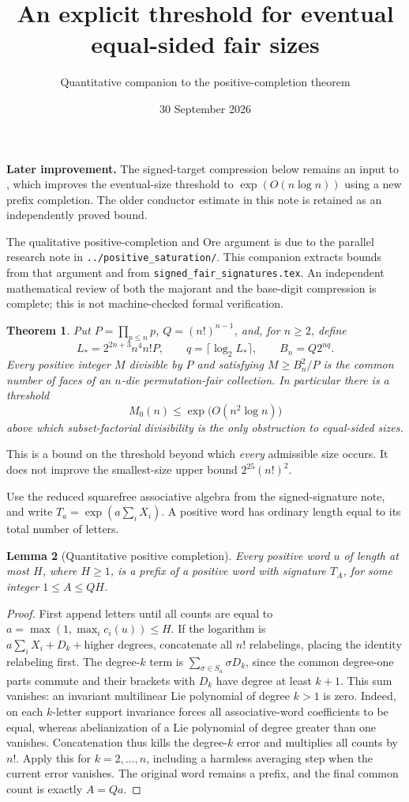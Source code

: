 \documentclass[11pt]{article}
\title{An explicit threshold for eventual equal-sided fair sizes}
\author{Quantitative companion to the positive-completion theorem}
\date{30 September 2026}
\newtheorem{theorem}{Theorem}
\newtheorem{lemma}[theorem]{Lemma}
\begin{document}
\noindent\textbf{Later improvement.} The signed-target compression below
remains an input to , which
improves the eventual-size threshold to $\exp(O(n\log n))$ using a new
prefix completion. The older conductor estimate in this note is retained
as an independently proved bound.

\maketitle

The qualitative positive-completion and Ore argument is due to the
parallel research note in \texttt{../positive\_saturation/}. This companion
extracts bounds from that argument and from
\texttt{signed\_fair\_signatures.tex}. An independent mathematical
review of both the majorant and the base-digit compression is complete;
this is not machine-checked formal verification.

\begin{theorem}\label{main}
Put $P=\prod_{p\le n}p$, $Q=(n!)^{n-1}$, and, for $n\ge2$, define
\[
 L_*=2^{2n+3}n^4n!P,\qquad q=\lceil\log_2L_*\rceil,
 \qquad B_n=Q2^{nq}.
\]
Every positive integer $M$ divisible by $P$ and satisfying
$M\ge B_n^2/P$ is the common number of faces of an $n$-die
permutation-fair collection. In particular there is a threshold
\[
 M_0(n)\le \exp\bigl(O(n^2\log n)\bigr)
\]
above which subset-factorial divisibility is the only obstruction to
equal-sided sizes.
\end{theorem}

This is a bound on the threshold beyond which \emph{every} admissible
size occurs. It does not improve the smallest-size upper bound
$2^{25}(n!)^2$.

Use the reduced squarefree associative algebra from the signed-signature
note, and write $T_a=\exp(a\sum_iX_i)$. A positive word has ordinary
length equal to its total number of letters.

\begin{lemma}[Quantitative positive completion]\label{completion}
Every positive word $u$ of length at most $H$, where $H\ge1$, is a
prefix of a positive word with signature $T_A$, for some integer
$1\le A\le QH$.
\end{lemma}
\begin{proof}
First append letters until all counts are equal to
$a=\max(1,\max_i c_i(u))\le H$. If the logarithm is
$a\sum_iX_i+D_k+\text{higher degrees}$, concatenate all $n!$
relabelings, placing the identity relabeling first. The degree-$k$
term is $\sum_{\sigma\in S_n}\sigma D_k$, since the common degree-one
parts commute and their brackets with $D_k$ have degree at least $k+1$.
This sum vanishes: an invariant multilinear Lie polynomial of degree
$k>1$ is zero. Indeed, on each $k$-letter support invariance forces all
associative-word coefficients to be equal, whereas abelianization of
a Lie polynomial of degree greater than one vanishes. Concatenation
thus kills the degree-$k$ error and multiplies all counts by $n!$.
Apply this for $k=2,\ldots,n$, including a harmless averaging step
when the current error vanishes. The original word remains a prefix,
and the final common count is exactly $A=Qa$.
\end{proof}
\end{document}
